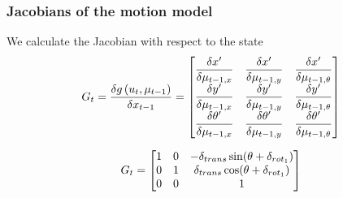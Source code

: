    \begin{frame}
    \frametitle{Jacobians of the motion model}
    We calculate the Jacobian with respect to the state
    \begin{equation*}
    G_{t} = \dfrac{\delta g\left( u_{t},\mu _{t-1} \right)}{\delta x _{t-1}} =
    \begin{bmatrix}
    \dfrac{\delta x^{\prime}}{\delta \mu _{t-1,x}} & \dfrac{\delta x^{\prime}}{\delta \mu _{t-1,y}} & \dfrac{\delta x^{\prime}}{\delta \mu _{t-1,\theta}}\\
    \dfrac{\delta y^{\prime}}{\delta \mu _{t-1,x}} & \dfrac{\delta y^{\prime}}{\delta \mu _{t-1,y}} & \dfrac{\delta y^{\prime}}{\delta \mu _{t-1,\theta}}\\
    \dfrac{\delta \theta^{\prime}}{\delta \mu _{t-1,x}} & \dfrac{\delta \theta^{\prime}}{\delta \mu _{t-1,y}} & \dfrac{\delta \theta^{\prime}}{\delta \mu _{t-1,\theta}}\\
    \end{bmatrix}
    \end{equation*}
   
    \begin{equation*}
    G_{t} =
    \begin{bmatrix}
    1 & 0 & -\delta_{trans} \sin(\theta + \delta_{rot_{1}})\\
    0 & 1 & \delta_{trans} \cos(\theta + \delta_{rot_{1}})\\
    0 & 0 & 1\\
    \end{bmatrix}
    \end{equation*}
\end{frame}


